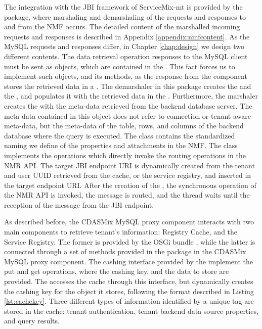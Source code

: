 The integration with the \ac{JBI} framework of ServiceMix-mt is provided by the  package, where marshaling and demarshaling of the requests and responses to and from the \ac{NMF} occurs. The detailed content of the marshalled incoming requests and responses is described in Appendix \ref{appendix:nmfcontent}. As the MySQL requests and responses differ, in Chapter \ref{chap:design} we design two different contents. The data retrieval operation responses to the MySQL client must be sent as  objects, which are contained in the . This fact forces us to implement such objects, and its methods, as the response from the  component stores the retrieved data in a . The demarshaler in this package creates the  and the , and populates it with the retrieved data in the . Furthermore, the marshaler creates the  with the meta-data retrieved from the backend database server. The meta-data contained in this object does not refer to connection or tenant-aware meta-data, but the meta-data of the table, rows, and columns of the backend database where the query is executed. The  class contains the standardized naming we define of the properties and attachments in the \ac{NMF}. The  class implements the operations which directly invoke the routing operations in the \ac{NMR} \ac{API}. The target \ac{JBI} endpoint \ac{URI} is dynamically created from the tenant and user \ac{UUID} retrieved from the cache, or the service registry, and inserted in the  target endpoint URI. After the creation of the , the synchronous  operation of the \ac{NMR} \ac{API} is invoked, the message is routed, and the thread waits until the reception of the message from the \ac{JBI} endpoint.

As described before, the CDASMix MySQL proxy component interacts with two main components to retrieve tenant's information: Registry Cache, and the Service Registry. The former is provided by the \ac{OSGi} bundle , while the latter is connected through a set of methods provided in the  package in the CDASMix MySQL proxy component. The cashing interface provided by the  implement the put and get operations, where the cashing key, and the data to store are provided. The  accesses the cache through this interface, but dynamically creates the cashing key for the object it stores, following the format described in Listing \ref{lst:cachekey}. Three different types of information identified by a unique tag are stored in the cache: tenant authentication, tenant backend data source properties, and query results. 

